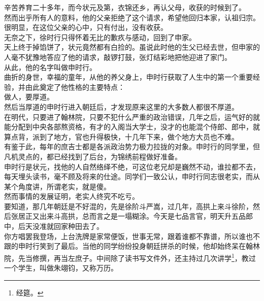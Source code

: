 \begin{multicols}{\theparacolNo}
辛苦养育二十多年，而今状元及第，衣锦还乡，再认父母，收获的时候到了。\\

然而出乎所有人的意料，他的父亲拒绝了这个请求，希望他回归本家，认祖归宗。\\

很明显，在这位父亲的心中，只有付出，没有收获。\\

无奈之下，徐时行只得怀着无比的歉疚与感动，回到了申家。\\

天上终于掉馅饼了，状元竟然都有白捡的。虽说此时他的生父已经去世，但申家的人毫不犹豫地答应了他的请求，敲锣打鼓，张灯结彩地把他迎进了家门。\\

从此，他的名字叫做申时行。\\

曲折的身世，幸福的童年，从他的养父身上，申时行获取了人生中的第一个重要经验，并由此奠定了他性格的主要特点：\\

做人，要厚道。\\

然后当厚道的申时行进入朝廷后，才发现原来这里的大多数人都很不厚道。\\

在明代，只要进了翰林院，只要不犯什么严重的政治错误，几年之后，运气好的就能分配到中央各部熬资格，有才的入阁当大学士，没才的也能混个侍郎、郎中，就算点背，派到了地方，官也升得极快，十几年下来，做个地方大员也不难。\\

有鉴于此，每年的庶吉士都是各派政治势力极力拉拢的对象。申时行的同学里，但凡机灵点的，都已经找到了后台，为锦绣前程做好准备。\\

申时行是状元，找他的人自然络绎不绝，可这位老兄却是巍然不动，谁拉都不去，每天埋头读书，毫不顾及将来的仕途。同学们一致公认，申时行同志很老实，而从某个角度讲，所谓老实，就是傻。\\

然而事情的发展证明，老实人终究不吃亏。\\

要知道，那几年朝廷是不好混的，先是徐阶斗严嵩，过几年，高拱上来斗徐阶，然后张居正又出来斗高拱，总而言之是一塌糊涂。今天是七品言官，明天升五品郎中，后天没准就回家种田去了。\\

你方唱罢我登场，上台洗牌是家常便饭，世事无常，跟着谁都不靠谱，所以谁也不跟的申时行笑到了最后。当他的同学纷纷投身朝廷拼杀的时候，他却始终呆在翰林院，先当修撰，再当左庶子。中间除了读书写文件外，还主持过几次讲学\footnote{经筵。}，教过一个学生，叫做朱翊钧，又称万历。\\


\end{multicols}
